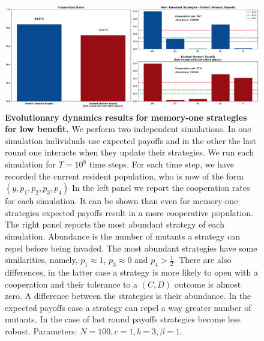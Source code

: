 \documentclass[11pt]{article}
\theoremstyle{plainCl1}
\theoremstyle{plainCl2}
\begin{document}
\begin{figure}[!htbp]
  \centering 
  \includegraphics[width=\textwidth]{static/memory_one_results_low_benefit.pdf}
  \caption{\textbf{Evolutionary dynamics results for memory-one strategies for low benefit.}
  We perform two independent simulations. In one simulation individuals use
  expected payoffs and in the other the last round one interacts when they
  update their strategies. We run each simulation for \(T = 10^8\) time steps.
  For each time step, we have recorded the current resident population, who is
  now of the form  \((y, p_1, p_2, p_3, p_4)\) In the left panel we report the
  cooperation rates for each simulation. It can be shown than even for
  memory-one strategies expected payoffs result in a more cooperative
  population. The right panel reports the most abundant strategy of each
  simulation. Abundance is the number of mutants a strategy can repel before
  being invaded. The most abundant strategies have some similarities,
  namely, \(p_1 \approx 1\), \(p_3 \approx 0\) and \(p_4 > \frac{1}{2}\). There are also differences, in the latter
  case a strategy is more likely to open with a cooperation and their tolerance to
  a \((C, D)\) outcome is almost zero. A difference between the strategies is their
  abundance. In the expected payoffs case a strategy can repel a way greater
  number of mutants. In the case of last round payoffs strategies become less
  robust. Parameters: \(N =100, c=1, b=3, \beta=1\).}\label{fig:memory_one_low_benefit}
\end{figure}
\end{document}
